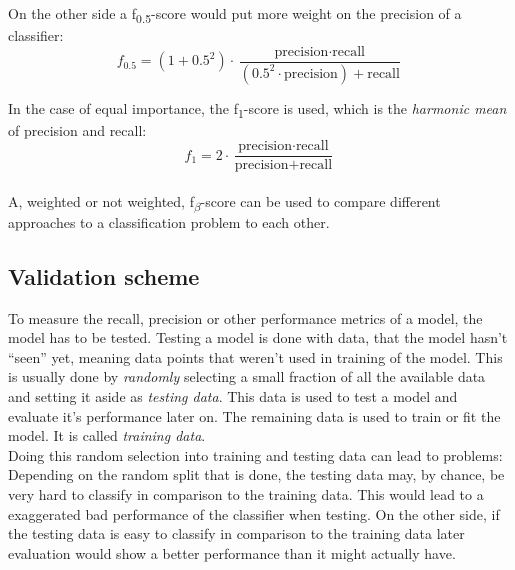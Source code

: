 On the other side a f\textsubscript{0.5}-score  would put more weight on the precision of a classifier:
\begin{equation} \label{eq:ev4}
f_0.5 = (1+0.5^2) \cdot \frac{\text{precision} \cdot \text{recall}}{(0.5^2 \cdot \text{precision}) + \text{recall}}
\end{equation}	

In the case of equal importance, the f\textsubscript{1}-score is used, which is the \emph{harmonic mean} of precision and recall:
\begin{equation} \label{eq:ev5}
f_1 = 2 \cdot \frac{\text{precision} \cdot \text{recall}}{\text{precision} + \text{recall}}
\end{equation}	
\\

A, weighted or not weighted, f\textsubscript{$\beta$}-score can be used to compare different approaches to a classification problem to each other. \cite{evalmetrics} \cite{evalmetrics2}


\subsection*{Validation scheme}

To measure the recall, precision or other performance metrics of a model, the model has to be tested. Testing a model is done with data, that the model hasn't ``seen'' yet, meaning data points that weren't used in training of the model. This is usually done by \textit{randomly} selecting a small fraction of all the available data and setting it aside as \textit{testing data}. This data is used to test a model and evaluate it's performance later on. The remaining data is used to train or fit the model. It is called \textit{training data}. 
\\
Doing this random selection into training and testing data can lead to problems: Depending on the random split that is done, the testing data may, by chance, be very hard to classify in comparison to the training data. This would lead to a exaggerated bad performance of the classifier when testing. On the other side, if the testing data is easy to classify in comparison to the training data later evaluation would show a better performance than it might actually have.
\\

